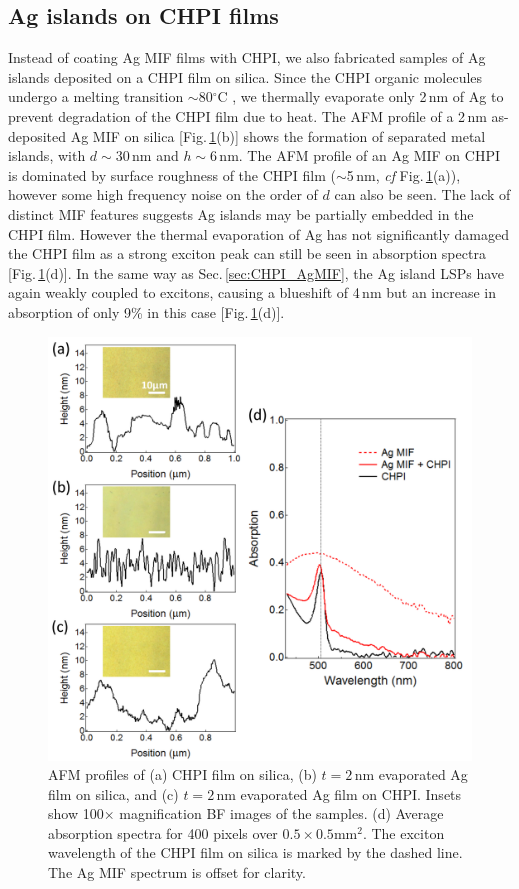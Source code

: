 \subsection{Ag islands on CHPI films}
\label{sec:AgonCHPI}

Instead of coating Ag MIF films with CHPI, we also fabricated samples of Ag islands deposited on a CHPI film on silica. Since the CHPI organic molecules undergo a melting transition $\sim$80$^{\circ}$C \cite{Barman2003}, we thermally evaporate only 2\,nm of Ag to prevent degradation of the CHPI film due to heat. The AFM profile of a 2\,nm as-deposited Ag MIF on silica [Fig.\,\ref{6Fig8}(b)] shows the formation of separated metal islands, with $d\sim30$\,nm and $h\sim6$\,nm. The AFM profile of an Ag MIF on CHPI is dominated by surface roughness of the CHPI film ($\sim$5\,nm, \textit{cf} Fig.\,\ref{6Fig8}(a)), however some high frequency noise on the order of $d$ can also be seen. The lack of distinct MIF features suggests Ag islands may be partially embedded in the CHPI film. However the thermal evaporation of Ag has not significantly damaged the CHPI film as a strong exciton peak can still be seen in absorption spectra [Fig.\,\ref{6Fig8}(d)]. In the same way as Sec.\,\ref{sec:CHPI_AgMIF}, the Ag island LSPs have again weakly coupled to excitons, causing a blueshift of 4\,nm but an increase in absorption of only 9\% in this case [Fig.\,\ref{6Fig8}(d)].
\begin{figure}[h!] 
\centering    
\includegraphics[width=\textwidth]{Fig8}
\caption{AFM profiles of (a) CHPI film on silica, (b) $t=2$\,nm evaporated Ag film on silica, and (c) $t=2$\,nm evaporated Ag film on CHPI. Insets show 100$\times$ magnification BF images of the samples. (d) Average absorption spectra for 400 pixels over $0.5\times0.5$mm$^2$. The exciton wavelength of the CHPI film on silica is marked by the dashed line. The Ag MIF spectrum is offset for clarity.}
\label{6Fig8}
\end{figure}

